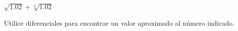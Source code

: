 \item $\sqrt{1.02} + \sqrt[4]{1.02}$
\par
Utilice diferenciales para encontrar un valor aproximado al número indicado.
